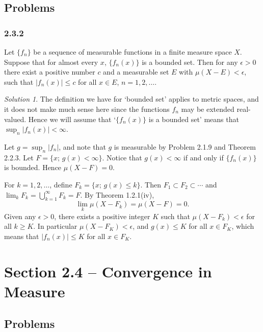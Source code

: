 \documentclass{report}
\theoremstyle{remark}
\newtheorem*{solution}{Solution}
\begin{document}
\subsection*{Problems}

\subsubsection*{2.3.2}
Let $\{f_n\}$ be a sequence of measurable functions in a finite measure space $X$. Suppose that for almost every $x$, $\{f_n(x)\}$ is a bounded set. Then for any $\epsilon > 0$ there exist a positive number $c$ and a measurable set $E$ with $\mu(X - E) < \epsilon$, such that $|f_n(x)| \le c$ for all $x \in E$, $n = 1,2, \dots$.

\begin{solution}
  The definition we have for `bounded set' applies to metric spaces, and it does not make much sense here since the functions $f_n$ may be extended real-valued. Hence we will assume that `$\{f_n(x)\}$ is a bounded set' means that $\sup_n |f_n(x)| < \infty$.

  Let $g = \sup_n |f_n|$, and note that $g$ is measurable by Problem 2.1.9 and Theorem 2.2.3. Let $F = \{x; \, g(x) < \infty\}$. Notice that $g(x) < \infty$ if and only if $\{f_n(x)\}$ is bounded. Hence $\mu(X - F) = 0$.

  For $k = 1,2,\dots$, define $F_k = \{x; \, g(x) \le k\}$. Then $F_1 \subset F_2 \subset \dotsm$ and $\lim_k F_k = \bigcup_{k=1}^\infty F_k = F$.  By Theorem 1.2.1(iv),
  \begin{equation*}
    \lim_k \mu(X - F_k) = \mu(X - F) = 0.
  \end{equation*}
  Given any $\epsilon > 0$, there exists a positive integer $K$ such that $\mu(X - F_k) < \epsilon$ for all $k \ge K$. In particular $\mu(X - F_K) < \epsilon$, and $g(x) \le K$ for all $x \in F_K$, which means that $|f_n(x)| \le K$ for all $x \in F_K$.
\end{solution}

\section*{Section 2.4 -- Convergence in Measure}

\subsection*{Problems}
\end{document}
